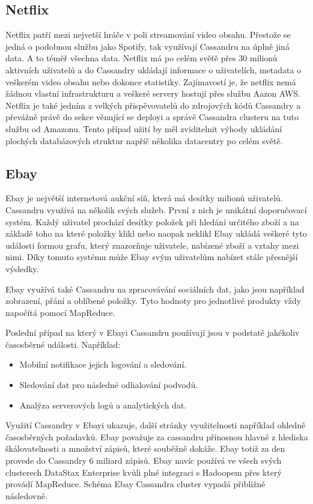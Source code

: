 \documentclass[thesis=M,czech]{FITthesis}[2012/06/26]
\begin{document}
\subsection{Netflix}
Netflix patří mezi nejvetší hráče v poli streamování video obsahu. Přestože se jedná o podobnou službu jako Spotify, tak využívají Cassandru na úplně jiná data. A to téměř všechna data. Netflix má po celém světě přes 30 milionů aktivních uživatelů a do Cassandry ukládají informace o uživatelích, metadata o veškerém video obsahu nebo dokonce statistiky. Zajímavostí je, že netflix nemá žádnou vlastní infrastrukturu a veškeré servery hostují přes službu Aazon AWS. Netflix je také jedním z velkých přispěvovatelů do zdrojových kódů Cassandry a převážně právě do sekce věnující se deployi a správě Cassandra clusteru na tuto službu od Amazonu. Tento případ užití by měl zviditelnit výhody ukládání plochých databázových struktur napříč několika datacentry po celém světě. 

\subsection{Ebay} 
Ebay je největší internetová aukční síň, která má desítky milionů uživatelů. Cassandru využívá na několik svých služeb. První z nich je unikátní doporučovací systém. Každý uživatel prochází desítky položek při hledání určitého zboží a na základě toho na které položky klikl nebo naopak neklikl Ebay ukládá veškeré tyto události formou grafu, který znazorňuje uživatele, nabízené zboží a vztahy mezi nimi. Díky tomuto systému může Ebay svým uživatelům nabízet stále přesnější výsledky. 

Ebay využívá také Cassandru na zpracovávání sociálních dat, jako jsou například zobrazení, přání a oblíbené položky. Tyto hodnoty pro jednotlivé produkty vždy napočítá pomocí MapReduce. 

Poslední případ na který v Ebayi Cassandru používají jsou v podstatě jakékoliv časosběrné události. Například:
\begin{itemize}
\item Mobilní notifikace jejich logování a sledování.
\item Sledování dat pro následné odhalování podvodů.
\item Analýza serverových logů a analytických dat.
\end{itemize}

Využití Cassandry v Ebayi ukazuje, další stránky využitelnosti například ohledně časosběrných požadavků. Ebay považuje za cassandru přínosnou hlavně z hlediska škálovatelnosti a množství zápisů, které souběžně dokáže. Ebay totiž za den provede do Cassandry 6 miliard zápisů.\cite{ebay} Ebay navíc používá ve všech svých clusterech DataStax Enterprise kvůli plné integraci s Hadoopem přes který provádí MapReduce. Schéma Ebay Cassandra cluster vypadá přibližně následovně.
\end{document}
